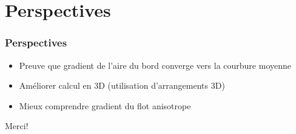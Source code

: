 \documentclass{beamer}
\begin{document}
\section{Perspectives}

\begin{frame}
    \frametitle{Perspectives}

    \begin{itemize}
        \item Preuve que gradient de l'aire du bord converge vers la courbure
            moyenne
        \item Améliorer calcul en 3D (utilisation d'arrangements 3D)
        \item Mieux comprendre gradient du flot anisotrope
    \end{itemize}
\end{frame}

\begin{frame}
    \begin{center}
        \huge{Merci!}
    \end{center}
\end{frame}
\end{document}
